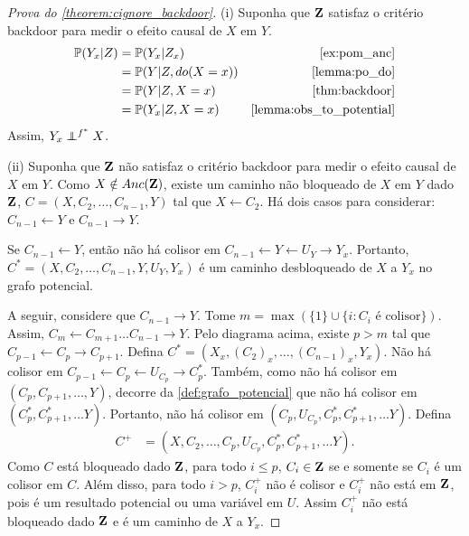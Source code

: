 \begin{proof}[Prova do \cref{theorem:cignore_backdoor}]
 (i) Suponha que ${\mathbf{Z}}$ satisfaz o critério backdoor 
 para medir o efeito causal de $X$ em $Y$.
 \begin{align*}
  \P(Y_x | Z)
  &= \P(Y_x | Z_x) & \text{\cref{ex:pom_anc}} \\
  &= \P(Y|Z, do(X=x)) &\text{\cref{lemma:po_do}} \\
  &= \P(Y|Z, X=x) & \text{\cref{thm:backdoor}} \\
  &= \P(Y_x|Z, X=x) & \text{\cref{lemma:obs_to_potential}}
 \end{align*}
 Assim, $Y_x \perp\!\!\!\!\perp^{f^*} X$.
 
 (ii) Suponha que ${\mathbf{Z}}$ não satisfaz 
 o critério backdoor para medir o efeito causal de $X$ em $Y$.
 Como $X \notin Anc({\mathbf{Z}})$, existe 
 um caminho não bloqueado de $X$ em $Y$ dado ${\mathbf{Z}}$,
 $C = (X, C_2, \ldots, C_{n-1}, Y)$ tal que
 $X \leftarrow C_2$.
 Há dois casos para considerar:
 $C_{n-1} \leftarrow Y$ e $C_{n-1} \rightarrow Y$.
 
 Se $C_{n-1} \leftarrow Y$, então
 não há colisor em 
 $C_{n-1} \leftarrow Y \leftarrow U_Y \rightarrow Y_x$.
 Portanto, $C^* = (X, C_2, \ldots, C_{n-1}, Y, U_Y, Y_x)$ é
 um caminho desbloqueado de $X$ a $Y_x$ no grafo potencial.
 
 A seguir, considere que $C_{n-1} \rightarrow Y$.
 Tome $m = \max(\{1\} \cup \{i: C_i \text{ é colisor} \})$. 
 Assim, $C_m \leftarrow C_{m+1} \ldots C_{n-1} \rightarrow Y$.
 Pelo diagrama acima, existe $p > m$ tal que 
 $C_{p-1} \leftarrow C_p \rightarrow C_{p+1}$.
 Defina $C^* = (X_x, (C_2)_x, \ldots, (C_{n-1})_x, Y_x)$.
 Não há colisor em 
 $C_{p-1} \leftarrow C_p \leftarrow U_{C_p} \rightarrow C^*_p$.
 Também, como não há colisor em $(C_p, C_{p+1}, \ldots, Y)$,
 decorre da \cref{def:grafo_potencial} que
 não há colisor em $(C^*_p, C^*_{p+1}, \ldots Y)$.
 Portanto, não há colisor em
 $(C_p, U_{C_p}, C^*_p, C^*_{p+1}, \ldots Y)$.
 Defina 
 \begin{align*}
  C^+ &= (X, C_2, \ldots, C_p, U_{C_p}, C^*_p, C^*_{p+1}, \ldots Y).
 \end{align*}
 Como $C$ está bloqueado dado ${\mathbf{Z}}$,
 para todo $i \leq p$, $C_i \in {\mathbf{Z}}$ 
 se e somente se $C_i$ é um colisor em $C$.
 Além disso, para todo $i > p$,
 $C^+_i$ não é colisor e 
 $C^+_i$ não está em ${\mathbf{Z}}$, pois
 é um resultado potencial ou uma variável em $U$.
 Assim $C^+_i$ não está bloqueado dado ${\mathbf{Z}}$ e
 é um caminho de $X$ a $Y_x$.
\end{proof}


